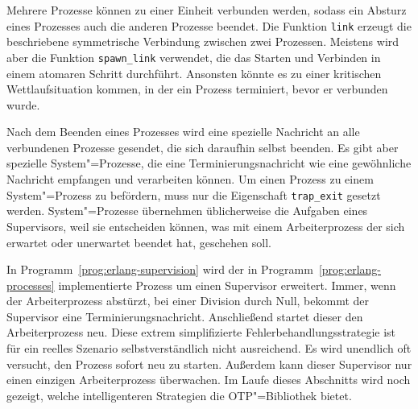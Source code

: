 Mehrere Prozesse können zu einer Einheit verbunden werden, sodass ein Absturz eines Prozesses auch die anderen Prozesse beendet. Die Funktion \lstinline{link} erzeugt die beschriebene symmetrische Verbindung zwischen zwei Prozessen. Meistens wird aber die Funktion \lstinline{spawn_link} verwendet, die das Starten und Verbinden in einem atomaren Schritt durchführt. Ansonsten könnte es zu einer kritischen Wettlaufsituation kommen, in der ein Prozess terminiert, bevor er verbunden wurde.

Nach dem Beenden eines Prozesses wird eine spezielle Nachricht an alle verbundenen Prozesse gesendet, die sich daraufhin selbst beenden. Es gibt aber spezielle System"=Prozesse, die eine Terminierungsnachricht wie eine gewöhnliche Nachricht empfangen und verarbeiten können. Um einen Prozess zu einem System"=Prozess zu befördern, muss nur die Eigenschaft \lstinline{trap_exit} gesetzt werden. System"=Prozesse übernehmen üblicherweise die Aufgaben eines Supervisors, weil sie entscheiden können, was mit einem Arbeiterprozess der sich erwartet oder unerwartet beendet hat, geschehen soll.

In Programm~\ref{prog:erlang-supervision} wird der in Programm~\ref{prog:erlang-processes} implementierte Prozess um einen Supervisor erweitert. Immer, wenn der Arbeiterprozess abstürzt, \zB bei einer Division durch Null, bekommt der Supervisor eine Terminierungsnachricht. Anschließend startet dieser den Arbeiterprozess neu. Diese extrem simplifizierte Fehlerbehandlungsstrategie ist für ein reelles Szenario selbstverständlich nicht ausreichend. Es wird unendlich oft versucht, den Prozess sofort neu zu starten. Außerdem kann dieser Supervisor nur einen einzigen Arbeiterprozess überwachen. Im Laufe dieses Abschnitts wird noch gezeigt, welche intelligenteren Strategien die OTP"=Bibliothek bietet.

